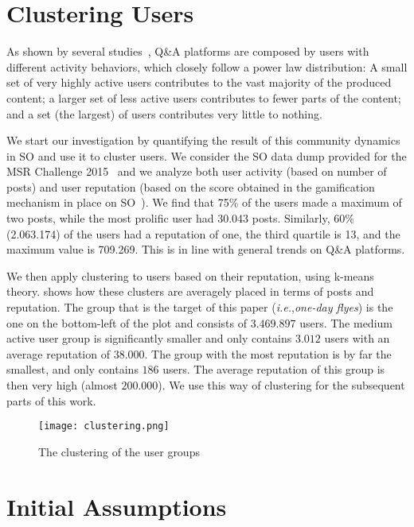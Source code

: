 \documentclass[conference]{IEEEtran}
\newcommand{\ie}{\emph{i.e.},\xspace}
\begin{document}
\section{Clustering Users}

As shown by several studies~\cite{yang2014sparrows}, Q\&A platforms are
composed by users with different activity behaviors, which closely follow a
power law distribution: A small set of very highly active users contributes
to the vast majority of the produced content; a larger set of less active users
contributes to fewer parts of the content; and a set (the largest) of users
contributes very little to nothing.

We start our investigation by quantifying the result of this community dynamics
in SO and use it to cluster users. We consider the SO data dump provided for the MSR Challenge
2015~\cite{MSRChallenge2015} and we analyze both user activity
(based on number of posts) and user reputation (based on the score obtained in
the gamification mechanism in place on SO~\cite{anderson2013steering}).
We find that 75\% of the users made a maximum of two posts, while the most
prolific user had 30.043 posts. Similarly, 60\% (2.063.174) of the users had a
reputation of one, the third quartile is 13, and the maximum value is 709.269.
This is in line with general trends on Q\&A platforms.

We then apply clustering to users based on their reputation, using k-means
theory.  shows how these clusters are averagely placed
in terms of posts and reputation. The group that is the target of this paper
(\ie \emph{one-day flyes}) is the one on the bottom-left of the plot and
consists of $3.469.897$ users. The medium active user group is significantly
smaller and only contains $3.012$ users with an average reputation of $38.000$.
The group with the most reputation is by far the smallest, and only contains
$186$ users. The average reputation of this group is then very high (almost
$200.000$). We use this way of clustering for the subsequent parts of this
work.


\begin{figure}[h]
 \texttt{[image: clustering.png]}
 \caption{The clustering of the user groups}
 \label{kmeans_clustering}
\end{figure}


\section{Initial Assumptions} \label{InitialAssumptions}
\end{document}
